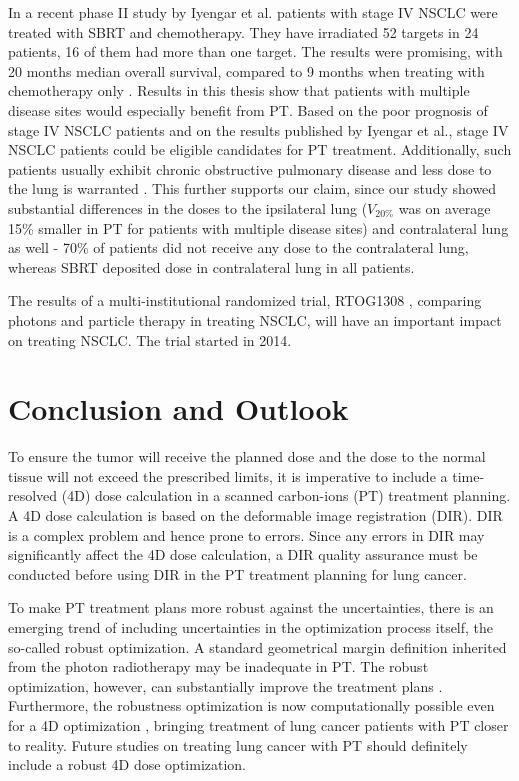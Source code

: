 In a recent phase II study by Iyengar et al. \cite{Iyengar2014} patients with stage IV NSCLC were treated with SBRT and chemotherapy. 
They have irradiated 52 targets in 24 patients, 16 of them had more than one target. The results were promising, with 20 months median overall survival, 
compared to 9 months when treating with chemotherapy only \cite{Tsao2008}. Results in this thesis show that patients with multiple disease sites 
would especially benefit from PT. Based on the poor prognosis of stage IV NSCLC patients and on the results published by Iyengar et al.,
stage IV NSCLC patients could be eligible candidates for PT treatment. Additionally, such patients usually exhibit chronic obstructive pulmonary disease and 
less dose to the lung is warranted \cite{Westover2012}. This further supports our claim, since our study showed substantial differences in 
the doses to the ipsilateral lung ($V_{20\%}$ was on average 15\% smaller in PT for patients with multiple disease sites) and 
contralateral lung as well - 70\% of patients did not receive any dose to the contralateral lung, whereas SBRT deposited dose in contralateral lung in all patients.

The results of a multi-institutional randomized trial, RTOG1308 \cite{RTOG1308}, comparing photons and particle therapy in treating NSCLC,
will have an important impact on treating NSCLC. The trial started in 2014.


\chapter{Conclusion and Outlook}


\vspace{15mm}

To ensure the tumor will receive the planned dose and the dose to the normal tissue will not exceed the prescribed limits, it is imperative
to include a time-resolved (4D) dose calculation in a scanned carbon-ions (PT) treatment planning. A 4D dose calculation is based on the deformable image registration (DIR).
DIR is a complex problem and hence prone to errors. Since any errors in DIR may significantly affect the 4D dose calculation, a DIR
quality assurance must be conducted before using DIR in the PT treatment planning for lung cancer.

\vspace{5mm}

To make PT treatment plans more robust against the uncertainties, there is an emerging trend of including uncertainties in the optimization process itself, the so-called robust optimization.
A standard geometrical margin definition inherited from the photon radiotherapy may be inadequate in PT. The robust optimization, however, can substantially improve the treatment plans \cite{Chen2012}. Furthermore, the robustness optimization is 
now computationally possible even for a 4D optimization \cite{Liu2016}, bringing treatment of lung cancer patients with PT closer to reality. Future studies on
treating lung cancer with PT should definitely include a robust 4D dose optimization.

